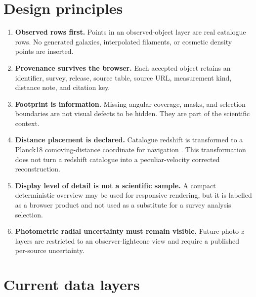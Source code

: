 \documentclass[11pt,a4paper]{article}
\begin{document}
\section{Design principles}

\begin{enumerate}[leftmargin=1.4em]
\item \textbf{Observed rows first.} Points in an observed-object layer are real catalogue rows. No generated galaxies, interpolated filaments, or cosmetic density points are inserted.
\item \textbf{Provenance survives the browser.} Each accepted object retains an identifier, survey, release, source table, source URL, measurement kind, distance note, and citation key.
\item \textbf{Footprint is information.} Missing angular coverage, masks, and selection boundaries are not visual defects to be hidden. They are part of the scientific context.
\item \textbf{Distance placement is declared.} Catalogue redshift is transformed to a Planck18 comoving-distance coordinate for navigation \cite{Planck2018}. This transformation does not turn a redshift catalogue into a peculiar-velocity corrected reconstruction.
\item \textbf{Display level of detail is not a scientific sample.} A compact deterministic overview may be used for responsive rendering, but it is labelled as a browser product and not used as a substitute for a survey analysis selection.
\item \textbf{Photometric radial uncertainty must remain visible.} Future photo-$z$ layers are restricted to an observer-lightcone view and require a published per-source uncertainty.
\end{enumerate}

\section{Current data layers}
\end{document}
